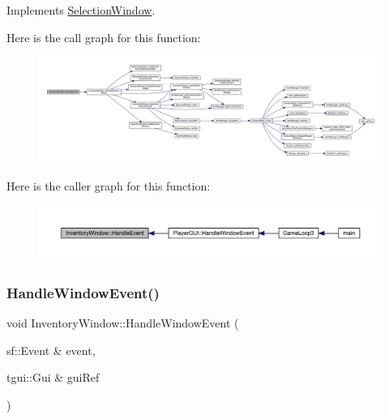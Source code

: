 Implements \mbox{\hyperlink{class_selection_window_a2a7aa65a4c77fce6f2a44a0d10b911eb}{Selection\+Window}}.

Here is the call graph for this function\+:
\nopagebreak
\begin{figure}[H]
\begin{center}
\leavevmode
\includegraphics[width=350pt]{d1/dee/class_inventory_window_ad023d9091385b9829673f6f592dd44ea_cgraph}
\end{center}
\end{figure}
Here is the caller graph for this function\+:
\nopagebreak
\begin{figure}[H]
\begin{center}
\leavevmode
\includegraphics[width=350pt]{d1/dee/class_inventory_window_ad023d9091385b9829673f6f592dd44ea_icgraph}
\end{center}
\end{figure}
\mbox{\label{class_inventory_window_a201c5b514200d4b3afc27fa056c1c365}} 
\subsubsection{\texorpdfstring{Handle\+Window\+Event()}{HandleWindowEvent()}}
{\footnotesize\ttfamily void Inventory\+Window\+::\+Handle\+Window\+Event (\begin{DoxyParamCaption}\item[{sf\+::\+Event \&}]{event,  }\item[{tgui\+::\+Gui \&}]{gui\+Ref }\end{DoxyParamCaption})}

